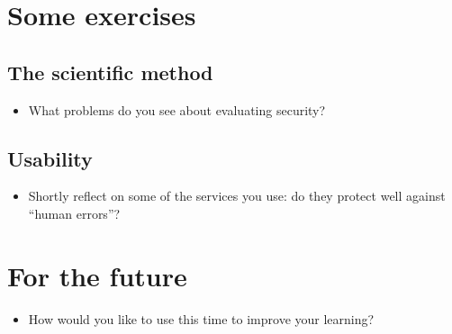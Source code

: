 \section{Some exercises}

\subsection{The scientific method}

\begin{frame}
  \begin{exercise}
    \begin{itemize}
      \item What problems do you see about evaluating security?
    \end{itemize}
  \end{exercise}
\end{frame}

\subsection{Usability}

\begin{frame}
  \begin{exercise}
    \begin{itemize}
      \item Shortly reflect on some of the services you use: do they protect 
        well against \enquote{human errors}?
    \end{itemize}
  \end{exercise}
\end{frame}


\section{For the future}

\begin{frame}
  \begin{question}
    \begin{itemize}
      \item How would you like to use this time to improve your learning?
    \end{itemize}
  \end{question}
\end{frame}



\begin{frame}[allowframebreaks]
  \printbibliography{}
\end{frame}
